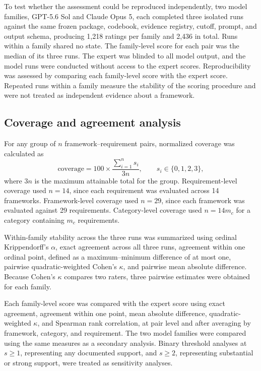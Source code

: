\documentclass[preprint,5p, 10pt, times]{elsarticle}
\begin{document}
To test whether the assessment could be reproduced independently, two model
families, GPT-5.6 Sol and Claude Opus 5, each completed three isolated runs
against the same frozen package, codebook, evidence registry, cutoff,
prompt, and output schema, producing 1,218 ratings per family and 2,436 in
total. Runs within a family shared no state. 
The family-level score for each pair was
the median of its three runs. The expert was blinded to all model output,
and the model runs were conducted without access to the expert scores.
Reproducibility was assessed by comparing each family-level score with the
expert score. Repeated runs within a family measure the stability of the
scoring procedure and were not treated as independent evidence about a
framework.

\subsection*{Coverage and agreement analysis}
For any group of $n$ framework--requirement pairs, normalized coverage was
calculated as
\begin{equation}
\text{coverage} = 100 \times \frac{\sum_{i=1}^{n} s_i}{3n},
\qquad s_i \in \{0,1,2,3\},
\end{equation}
where $3n$ is the maximum attainable total for the group. Requirement-level
coverage used $n = 14$, since each requirement was evaluated across 14
frameworks. Framework-level coverage used $n = 29$, since each framework was
evaluated against 29 requirements. Category-level coverage used
$n = 14 m_c$ for a category containing $m_c$ requirements.

Within-family stability across the three runs was summarized using ordinal
Krippendorff's $\alpha$, exact agreement across all three runs, agreement
within one ordinal point, defined as a maximum--minimum difference of at
most one, pairwise quadratic-weighted Cohen's $\kappa$, and pairwise mean
absolute difference.\cite{hayes2007answering,cohen1968weighted}
Because Cohen's $\kappa$ compares two raters, three pairwise estimates were
obtained for each family.

Each family-level score was compared with the expert score using exact
agreement, agreement within one point, mean absolute difference,
quadratic-weighted $\kappa$, and Spearman rank correlation, at pair level
and after averaging by framework, category, and requirement. The two model
families were compared using the same measures as a secondary analysis.
Binary threshold analyses at $s \geq 1$, representing any documented
support, and $s \geq 2$, representing substantial or strong support, were
treated as sensitivity analyses. 
\end{document}
